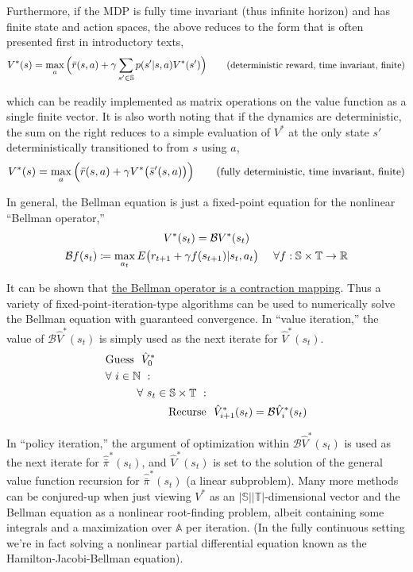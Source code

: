Furthermore, if the MDP is fully time invariant (thus infinite horizon) and has finite state and action spaces, the above reduces to the form that is often presented first in introductory texts,
\begin{equation*}
V^*(s) = \max_{a} \Big{(} \bar{r}(s, a) + \gamma \sum_{s' \in \mathbb{S}} p(s'|s,a) V^*(s') \Big{)} \tag{\small{deterministic reward, time invariant, finite}}
\end{equation*}

which can be readily implemented as matrix operations on the value function as a single finite vector. It is also worth noting that if the dynamics are deterministic, the sum on the right reduces to a simple evaluation of $V^*$ at the only state $s'$ deterministically transitioned to from $s$ using $a$,
\begin{equation*}
V^*(s) = \max_{a} \Big{(} \bar{r}(s, a) + \gamma V^*\big{(}\bar{s}'(s, a)\big{)} \Big{)} \tag{\small{fully deterministic, time invariant, finite}}
\end{equation*}

In general, the Bellman equation is just a fixed-point equation for the nonlinear ``Bellman operator,''
\begin{gather*}
V^*(s_t) = \mathcal{B}V^*(s_t)\\
\mathcal{B} f(s_t) \coloneqq \max_{a_t} E\big{(}r_{t+1} + \gamma f(s_{t+1}) | s_t, a_t\big{)}\ \ \ \ \forall f : \mathbb{S} \times \mathbb{T} \to \mathbb{R}
\end{gather*}

It can be shown that \href{https://people.eecs.berkeley.edu/~ananth/223Spr07/ee223_spr07_lec19.pdf}{the Bellman operator is a contraction mapping}. Thus a variety of fixed-point-iteration-type algorithms can be used to numerically solve the Bellman equation with guaranteed convergence. In ``value iteration,'' the value of $\mathcal{B}\hat{V}^*(s_t)$ is simply used as the next iterate for $\hat{V}^*(s_t)$.
\begin{align*}
&\text{Guess}\ \ \hat{V}^*_0\\
&\forall\ i \in \mathbb{N}\ :\\
&\text{\tab} \forall\ s_t \in {\mathbb{S} \times \mathbb{T}}\ :\\
&\text{\tab \tab Recurse}\ \ \hat{V}^*_{i+1}(s_t) = \mathcal{B}\hat{V}^*_i(s_t)
\end{align*}

In ``policy iteration,'' the argument of optimization within $\mathcal{B}\hat{V}^*(s_t)$ is used as the next iterate for $\hat{\bar{\pi}}^*(s_t)$, and $\hat{V}^*(s_t)$ is set to the solution of the general value function recursion for $\hat{\bar{\pi}}^*(s_t)$ (a linear subproblem). Many more methods can be conjured-up when just viewing $V^*$ as an $|\mathbb{S}||\mathbb{T}|$-dimensional vector and the Bellman equation as a nonlinear root-finding problem, albeit containing some integrals and a maximization over $\mathbb{A}$ per iteration. (In the fully continuous setting we're in fact solving a nonlinear partial differential equation known as the Hamilton-Jacobi-Bellman equation).\\

